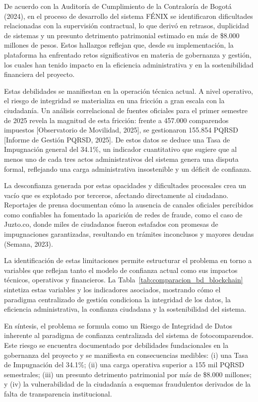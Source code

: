De acuerdo con la Auditoría de Cumplimiento de la Contraloría de Bogotá (2024), en el proceso de desarrollo del sistema FÉNIX se identificaron dificultades relacionadas con la supervisión contractual, lo que derivó en retrasos, duplicidad de sistemas y un presunto detrimento patrimonial estimado en más de \$8.000 millones de pesos. Estos hallazgos reflejan que, desde su implementación, la plataforma ha enfrentado retos significativos en materia de gobernanza y gestión, los cuales han tenido impacto en la eficiencia administrativa y en la sostenibilidad financiera del proyecto.

Estas debilidades se manifiestan en la operación técnica actual. A nivel operativo, el riesgo de integridad se materializa en una fricción a gran escala con la ciudadanía. Un análisis correlacional de fuentes oficiales para el primer semestre de 2025 revela la magnitud de esta fricción: frente a 457.000 comparendos impuestos [Observatorio de Movilidad, 2025], se gestionaron 155.854 PQRSD [Informe de Gestión PQRSD, 2025]. De estos datos se deduce una Tasa de Impugnación general del 34.1\%, un indicador cuantitativo que sugiere que al menos uno de cada tres actos administrativos del sistema genera una disputa formal, reflejando una carga administrativa insostenible y un déficit de confianza.

La desconfianza generada por estas opacidades y dificultades procesales crea un vacío que es explotado por terceros, afectando directamente al ciudadano. Reportajes de prensa documentan cómo la ausencia de canales oficiales percibidos como confiables ha fomentado la aparición de redes de fraude, como el caso de Juzto.co, donde miles de ciudadanos fueron estafados con promesas de impugnaciones garantizadas, resultando en trámites inconclusos y mayores deudas (Semana, 2023).

La identificación de estas limitaciones permite estructurar el problema en torno a variables que reflejan tanto el modelo de confianza actual como sus impactos técnicos, operativos y financieros. La Tabla~\ref{tab:comparacion_bd_blockchain} sintetiza estas variables y los indicadores asociados, mostrando cómo el paradigma centralizado de gestión condiciona la integridad de los datos, la eficiencia administrativa, la confianza ciudadana y la sostenibilidad del sistema.



En síntesis, el problema se formula como un Riesgo de Integridad de Datos inherente al paradigma de confianza centralizada del sistema de fotocomparendos. Este riesgo se encuentra documentado por debilidades fundacionales en la gobernanza del proyecto y se manifiesta en consecuencias medibles: (i) una Tasa de Impugnación del 34.1\%; (ii) una carga operativa superior a 155 mil PQRSD semestrales; (iii) un presunto detrimento patrimonial por más de \$8.000 millones; y (iv) la vulnerabilidad de la ciudadanía a esquemas fraudulentos derivados de la falta de transparencia institucional.

